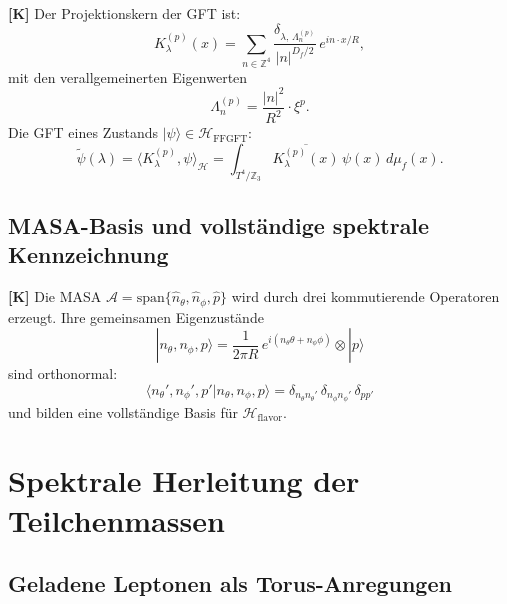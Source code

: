 \textbf{[K]} Der Projektionskern der GFT ist:
\begin{equation}
  K_\lambda^{(p)}(x) = \sum_{n \in \mathbb{Z}^4}
  \frac{\delta_{\lambda,\, \Lambda_n^{(p)}}}{|n|^{D_f/2}}\,
  e^{in\cdot x/R},
  \label{eq:kern}
\end{equation}
mit den verallgemeinerten Eigenwerten
\begin{equation}
  \Lambda_n^{(p)} = \frac{|n|^2}{R^2}\cdot\xi^p.
  \label{eq:lambda_n}
\end{equation}
Die GFT eines Zustands $|\psi\rangle \in \mathcal{H}_{\mathrm{FFGFT}}$:
\begin{equation}
  \tilde{\psi}(\lambda) = \langle K_\lambda^{(p)}, \psi \rangle_{\mathcal{H}}
  = \int_{T^4/\mathbb{Z}_3} \overline{K_\lambda^{(p)}(x)}\,
  \psi(x)\, d\mu_f(x).
  \label{eq:gft}
\end{equation}

\subsection{MASA-Basis und vollständige spektrale Kennzeichnung}

\textbf{[K]} Die MASA $\mathcal{A} = \mathrm{span}\{\hat{n}_\theta,
\hat{n}_\phi, \hat{p}\}$ wird durch drei kommutierende Operatoren
erzeugt. Ihre gemeinsamen Eigenzustände
\begin{equation}
  |n_\theta, n_\phi, p\rangle
  = \frac{1}{2\pi R}\, e^{i(n_\theta\theta + n_\phi\phi)}
  \otimes |p\rangle
  \label{eq:basis}
\end{equation}
sind orthonormal:
\begin{equation}
  \langle n_\theta', n_\phi', p' | n_\theta, n_\phi, p \rangle
  = \delta_{n_\theta n_\theta'}\,\delta_{n_\phi n_\phi'}\,
  \delta_{pp'}
\end{equation}
und bilden eine vollständige Basis für
$\mathcal{H}_{\mathrm{flavor}}$.

\section{Spektrale Herleitung der Teilchenmassen}
\label{sec:massen}

\subsection{Geladene Leptonen als Torus-Anregungen}

